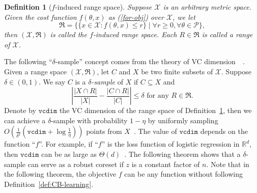 \documentclass{article}
\newtheorem{definition}{Definition}
\begin{document}
\begin{definition}[$f$-induced range space]
\label{def-range}
	Suppose $\mathcal{X}$ is an arbitrary metric space. 
	Given the cost function $ f(\theta,x)$ as (\ref{for-obj}) over $\mathcal{X}$, we let
	\begin{equation}\label{range}
		\mathfrak{R}=\Big\{ \{  x\in \mathcal{X}:f(\theta,x)\leq r \}\mid \forall r \geq 0, \forall \theta\in\mathcal{P} \Big\} ,
	\end{equation} 
	then $ (\mathcal{X},\mathfrak{R}) $ is called the $f$-induced range space. Each $R\in \mathfrak{R}$ is called a range of $\mathcal{X}$.
	\end{definition}
The following ``$ \delta $-sample'' concept comes from the theory of VC dimension~~\cite{li2001improved}. 
Given a range space $ (\mathcal{X},\mathfrak{R}) $, let $ C$ and $ X $ be two finite subsets of $ \mathcal{X} $. Suppose $\delta\in(0,1)$. We say $ C $ is a \emph{$ \delta $-sample} of $ X $ if $ C\subseteq X $ and   
\begin{equation}
  \left| \frac{|X\cap R|}{|X|}-\frac{|C\cap R|}{|C|} \right|\leq \delta  \text{ for any } R\in\mathfrak{R}.\label{for-deltasample}
  \end{equation} 
Denote by $ \mathtt{vcdim} $ the VC dimension of the range space of Definition~\ref{def-range}, then we can achieve a $ \delta $-sample with probability $ 1-\eta $ by uniformly sampling $ O(\frac{1}{\delta^2}(\mathtt{vcdim}+\log \frac{1}{\eta})) $ points from $X$~\cite{li2001improved}. The value of $ \mathtt{vcdim} $ depends on the function ``$ f$''. For example, if ``$ f$'' is the loss function of logistic regression in $ \mathbb{R}^d $, then $ \mathtt{vcdim}$ can be as large as $ \Theta(d) $~\cite{MunteanuSSW18}. 
The following theorem shows that a $ \delta $-sample can serve as a robust coreset if $z$ is a constant factor of $n$. Note that in the following theorem, the objective $f$ can be any function without following Definition~\ref{def:CB-learning}. 
\end{document}
